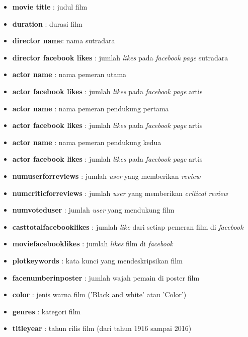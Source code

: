\begin{itemize}
\item 	\textbf{movie \textunderscore title} : judul film
\item   \textbf{duration}	 : durasi film
\item	\textbf{director \textunderscore name}: nama sutradara 
\item	\textbf{director \textunderscore facebook \textunderscore likes} : jumlah \textit{likes} pada \textit{facebook page} sutradara
\item	\textbf{actor  \textunderscore name} : nama pemeran utama 
\item	\textbf{actor  \textunderscore facebook \textunderscore likes} : jumlah \textit{likes} pada \textit{facebook page} artis 

\item	\textbf{actor  \textunderscore name} : nama pemeran pendukung pertama 
\item	\textbf{actor  \textunderscore facebook \textunderscore likes} : jumlah \textit{likes} pada \textit{facebook page} artis 

\item	\textbf{actor  \textunderscore name} : nama pemeran pendukung kedua  
\item	\textbf{actor  \textunderscore facebook \textunderscore likes} : jumlah \textit{likes} pada \textit{facebook page} artis 


\item \textbf{num\textunderscore user\textunderscore for\textunderscore reviews} : jumlah \textit{user} yang memberikan \textit{review}
\item \textbf{num\textunderscore critic\textunderscore for\textunderscore reviews} : jumlah \textit{user} yang memberikan \textit{critical review}
\item \textbf{num\textunderscore voted\textunderscore user} : jumlah \textit{user} yang mendukung film
\item \textbf{cast\textunderscore total\textunderscore facebook\textunderscore likes} : jumlah \textit{like} dari setiap pemeran film di \textit{facebook}

\item \textbf{movie\textunderscore facebook\textunderscore likes} : jumlah \textit{likes} film di \textit{facebook}
\item \textbf{plot\textunderscore keywords} : kata kunci yang mendeskripsikan film 
\item \textbf{facenumber\textunderscore in\textunderscore poster} : jumlah wajah pemain di poster film 
\item \textbf{color} : jenis warna film ('Black and white' atau 'Color')
\item \textbf{genres}  : kategori film 
\item \textbf{title\textunderscore year} : tahun rilis film (dari tahun 1916 sampai 2016)


\end{itemize}
